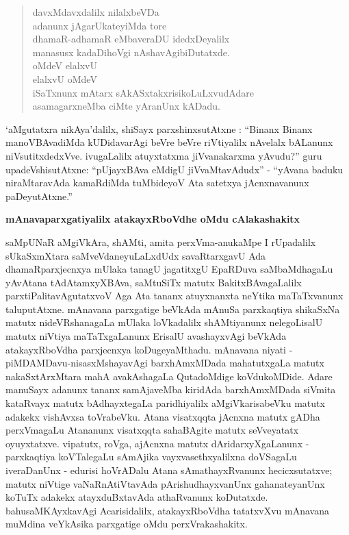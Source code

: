 \begin{verse}
davxMdavxdalilx nilalxbeVDa\\
adanunx jAgarUkateyiMda tore\\
dhamaR-adhamaR eMbaveraDU idedxDeyalilx\\
manasusx kadaDihoVgi nAshavAgibiDutatxde.\\
oMdeV elalxvU\\
elalxvU oMdeV\\
iSaTxnunx mAtarx sAkASxtakxrisikoLuLxvudAdare\\
asamagarxneMba ciMte yAranUnx kADadu.
\end{verse}

`aMgutatxra nikAya'dalilx, shiSayx parxshinxsutAtxne : ``Binanx Binanx manoVBAvadiMda kUDidavarAgi beVre beVre riVtiyalilx nAvelalx bALanunx niVsutitxdedxVve. ivugaLalilx atuyxtatxma jiVvanakarxma yAvudu?'' guru upadeVshisutAtxne: ``pUjayxBAva eMdigU jiVvaMtavAdudx'' - ``yAvana baduku niraMtaravAda kamaRdiMda tuMbideyoV Ata satetxya jAcnxnavanunx paDeyutAtxne.''

\smallskip
\begin{center}
{\Large\bf mAnavaparxgatiyalilx atakayxRboVdhe oMdu cAlakashakitx}
\end{center}

saMpUNaR aMgiVkAra, shAMti, amita perxVma-anukaMpe I rUpadalilx sUkaSxmXtara saMveVdaneyuLaLxdUdx savaRtarxgavU Ada dhamaRparxjecnxya mUlaka tanagU jagatitxgU EpaRDuva saMbaMdhagaLu yAvAtana tAdAtamxyXBAva, saMtuSiTx matutx BakitxBAvagaLalilx parxtiPalitavAgutatxvoV Aga Ata tananx atuyxnanxta neYtika maTaTxvanunx taluputAtxne. mAnavana parxgatige beVkAda mAnuSa parxkaqtiya shikaSxNa matutx nideVRshanagaLa mUlaka loVkadalilx shAMtiyanunx nelegoLisalU matutx niVtiya maTaTxgaLanunx ErisalU avashayxvAgi beVkAda atakayxRboVdha parxjecnxya koDugeyaMthadu. mAnavana niyati - piMDAMDavu-nisasxMshayavAgi barxhAmxMDada mahatutxgaLa matutx nakaSxtArxMtara mahA avakAshagaLa QutadoMdige koVdukoMDide. Adare manuSayx adanunx tananx samAjaveMba kiridAda barxhAmxMDada siVmita kataRvayx matutx bAdhayxtegaLa paridhiyalilx aMgiVkarisabeVku matutx adakekx vishAvxsa toVrabeVku. Atana visatxqqta jAcnxna matutx gADha perxVmagaLu Atananunx visatxqqta sahaBAgite matutx seVveyatatx oyuyxtatxve. vipatutx, roVga, ajAcnxna matutx dAridarxyXgaLanunx - parxkaqtiya koVTalegaLu sAmAjika vayxvasethxyalilxna doVSagaLu iveraDanUnx - edurisi hoVrADalu Atana sAmathayxRvanunx hecicxsutatxve; matutx niVtige vaNaRnAtiVtavAda pArishudhayxvanUnx gahanateyanUnx koTuTx adakekx atayxduBxtavAda athaRvanunx koDutatxde. bahusaMKAyxkavAgi Acarisidalilx, atakayxRboVdha tatatxvXvu mAnavana muMdina veYkAsika parxgatige oMdu perxVrakashakitx.

\theendnotes





